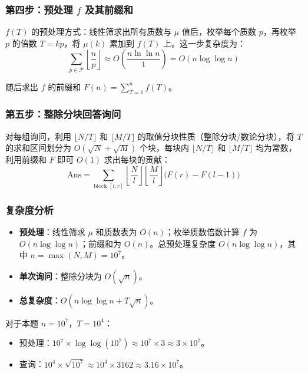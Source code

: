 \documentclass[11pt,a4paper,twocolumn]{ctexart}  %
\begin{document}
\subsubsection*{第四步：预处理 $f$ 及其前缀和}

$f(T)$ 的预处理方式：线性筛求出所有质数与 $\mu$ 值后，枚举每个质数 $p$，再枚举 $p$ 的倍数 $T = kp$，将 $\mu(k)$ 累加到 $f(T)$ 上。这一步复杂度为：
\[
    \sum_{p \in \mathcal{P}} \left\lfloor \frac{n}{p} \right\rfloor \approx O\!\left(\frac{n \ln \ln n}{1}\right) = O(n \log \log n)
\]

随后求出 $f$ 的前缀和 $F(n) = \sum_{T=1}^{n} f(T)$。

\subsubsection*{第五步：整除分块回答询问}

对每组询问，利用 $\lfloor N/T \rfloor$ 和 $\lfloor M/T \rfloor$ 的取值分块性质（整除分块/数论分块），将 $T$ 的求和区间划分为 $O(\sqrt{N} + \sqrt{M})$ 个块，每块内 $\lfloor N/T \rfloor$ 和 $\lfloor M/T \rfloor$ 均为常数，利用前缀和 $F$ 即可 $O(1)$ 求出每块的贡献：
\[
    \mathrm{Ans} = \sum_{\text{block } [l,r]} \left\lfloor \frac{N}{l} \right\rfloor \left\lfloor \frac{M}{l} \right\rfloor \bigl(F(r) - F(l-1)\bigr)
\]

\subsubsection*{复杂度分析}

\begin{itemize}
    \item \textbf{预处理}：线性筛求 $\mu$ 和质数表为 $O(n)$；枚举质数倍数计算 $f$ 为 $O(n \log \log n)$；前缀和为 $O(n)$。总预处理复杂度 $O(n \log \log n)$，其中 $n = \max(N, M) = 10^7$。
    \item \textbf{单次询问}：整除分块为 $O(\sqrt{n})$。
    \item \textbf{总复杂度}：$O(n \log \log n + T\sqrt{n})$。
\end{itemize}

对于本题 $n = 10^7$，$T = 10^4$：
\begin{itemize}
    \item 预处理：$10^7 \times \log \log(10^7) \approx 10^7 \times 3 \approx 3 \times 10^7$。
    \item 查询：$10^4 \times \sqrt{10^7} \approx 10^4 \times 3162 \approx 3.16 \times 10^7$。
\end{itemize}
\end{document}
